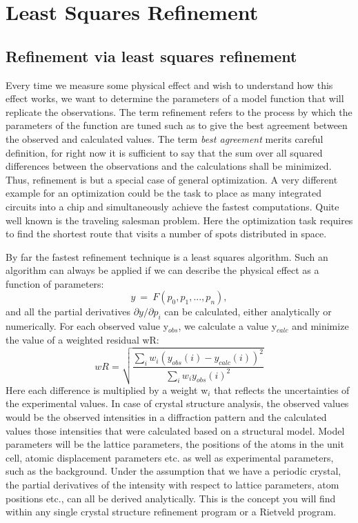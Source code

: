 
\chapter{Least Squares Refinement \label{lsq}}
\section{Refinement via least squares refinement \label{lsq-algo}}

Every time we measure some physical effect and wish to understand
how this effect works, we want to determine the parameters of a 
model function that will replicate the observations. The term 
refinement refers to the process by which the parameters of the
function are tuned such as to give the best agreement between
the observed and calculated values. The term {\it best agreement}
merits careful definition, for right now it is sufficient to say
that the sum over all squared differences between the observations and the 
calculations shall be minimized. Thus, refinement is but a special
case of general optimization. A very different example for an 
optimization could be the task to place as many integrated 
circuits into a chip and simultaneously achieve the fastest computations.
Quite well known is the traveling salesman problem. Here the 
optimization task requires to find the shortest route that 
visits a number of spots distributed in space.  

By far the fastest refinement technique is a least squares algorithm.
Such an algorithm can always be applied if we can describe the 
physical effect as a function of parameters:
\begin{equation}
  y ~=~ F(p_{0}, p_{1}, ..., p_{n}),
\end{equation}
and all the partial derivatives $\partial y/ \partial p_{i}$ can 
be calculated, either analytically or numerically. For each 
observed value y$_{obs}$, we calculate a value y$_{calc}$ and 
minimize the value of a weighted residual wR:
\begin{equation}
   wR = \sqrt{\frac{\sum_{i} w_{i} (y_{obs}(i) - y_{calc}(i))^2}
                   {\sum_{i} w_{i} y_{obs}(i)^2}}
  \label{diff-eq-rval}
\end{equation}
Here each difference is multiplied by a weight w$_{i}$ that reflects
the uncertainties of the experimental values. In case of crystal 
structure analysis, the observed values would be the observed 
intensities in a diffraction pattern and the calculated values 
those intensities that were calculated based on a structural model. 
Model parameters will be the lattice parameters, the positions
of the atoms in the unit cell, atomic displacement parameters etc.
as well as experimental parameters, such as the background.
Under the assumption that we have a periodic crystal, the 
partial derivatives of the intensity with respect to lattice
parameters, atom positions etc., can all be derived analytically.
This is the concept you will find within any single crystal structure
refinement program or a Rietveld program.

